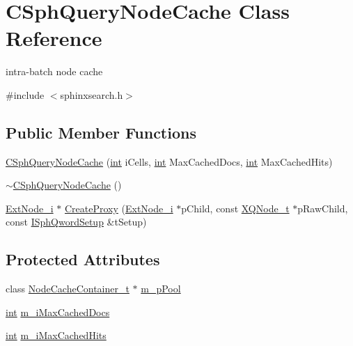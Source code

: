 \hypertarget{classCSphQueryNodeCache}{\section{C\-Sph\-Query\-Node\-Cache Class Reference}
\label{classCSphQueryNodeCache}
}


intra-\/batch node cache  




{\ttfamily \#include $<$sphinxsearch.\-h$>$}

\subsection*{Public Member Functions}
\begin{DoxyCompactItemize}
\item 
\hyperlink{classCSphQueryNodeCache_ab2c1335849b042b162207b929307f7dc}{C\-Sph\-Query\-Node\-Cache} (\hyperlink{sphinxexpr_8cpp_a4a26e8f9cb8b736e0c4cbf4d16de985e}{int} i\-Cells, \hyperlink{sphinxexpr_8cpp_a4a26e8f9cb8b736e0c4cbf4d16de985e}{int} Max\-Cached\-Docs, \hyperlink{sphinxexpr_8cpp_a4a26e8f9cb8b736e0c4cbf4d16de985e}{int} Max\-Cached\-Hits)
\item 
\hyperlink{classCSphQueryNodeCache_a2a34ffa46dc20e01cb7e53666f2d6a3a}{$\sim$\-C\-Sph\-Query\-Node\-Cache} ()
\item 
\hyperlink{classExtNode__i}{Ext\-Node\-\_\-i} $\ast$ \hyperlink{classCSphQueryNodeCache_a2b9eed496e0981dfe6a58279de094947}{Create\-Proxy} (\hyperlink{classExtNode__i}{Ext\-Node\-\_\-i} $\ast$p\-Child, const \hyperlink{structXQNode__t}{X\-Q\-Node\-\_\-t} $\ast$p\-Raw\-Child, const \hyperlink{classISphQwordSetup}{I\-Sph\-Qword\-Setup} \&t\-Setup)
\end{DoxyCompactItemize}
\subsection*{Protected Attributes}
\begin{DoxyCompactItemize}
\item 
class \hyperlink{classNodeCacheContainer__t}{Node\-Cache\-Container\-\_\-t} $\ast$ \hyperlink{classCSphQueryNodeCache_aec59621ee1b07bb83caea0a2b24dd0ca}{m\-\_\-p\-Pool}
\item 
\hyperlink{sphinxexpr_8cpp_a4a26e8f9cb8b736e0c4cbf4d16de985e}{int} \hyperlink{classCSphQueryNodeCache_a14cf24fd5d3b6171033d44337cecc365}{m\-\_\-i\-Max\-Cached\-Docs}
\item 
\hyperlink{sphinxexpr_8cpp_a4a26e8f9cb8b736e0c4cbf4d16de985e}{int} \hyperlink{classCSphQueryNodeCache_aed09ffd75262e5a617fb5fbac132869f}{m\-\_\-i\-Max\-Cached\-Hits}
\end{DoxyCompactItemize}
